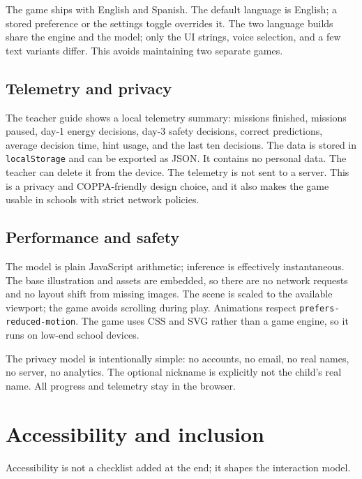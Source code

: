 \documentclass[11pt,a4paper]{article}
\newcommand{\code}[1]{\texttt{#1}}
\begin{document}
The game ships with English and Spanish. The default language is English; a stored preference or the settings toggle overrides it. The two language builds share the engine and the model; only the UI strings, voice selection, and a few text variants differ. This avoids maintaining two separate games.

\subsection{Telemetry and privacy}

The teacher guide shows a local telemetry summary: missions finished, missions paused, day-1 energy decisions, day-3 safety decisions, correct predictions, average decision time, hint usage, and the last ten decisions. The data is stored in \code{localStorage} and can be exported as JSON. It contains no personal data. The teacher can delete it from the device. The telemetry is not sent to a server. This is a privacy and COPPA-friendly design choice, and it also makes the game usable in schools with strict network policies.

\subsection{Performance and safety}

The model is plain JavaScript arithmetic; inference is effectively instantaneous. The base illustration and assets are embedded, so there are no network requests and no layout shift from missing images. The scene is scaled to the available viewport; the game avoids scrolling during play. Animations respect \code{prefers-reduced-motion}. The game uses CSS and SVG rather than a game engine, so it runs on low-end school devices.

The privacy model is intentionally simple: no accounts, no email, no real names, no server, no analytics. The optional nickname is explicitly not the child's real name. All progress and telemetry stay in the browser.

\section{Accessibility and inclusion}

Accessibility is not a checklist added at the end; it shapes the interaction model.
\end{document}
